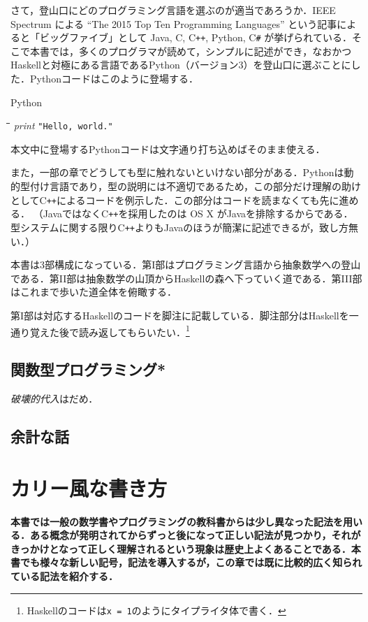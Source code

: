 \documentclass[twocolumn]{jsbook}
\newcommand{\cxx}{\textrm{C}\texttt{++}}
\newcommand{\keyword}[1]{{\emph{#1}}}
\newcommand{\code}[1]{\texttt{#1}}
\newenvironment{leader}{\begingroup\bf}{\endgroup}
\newenvironment{pythoncode}{\begin{itembox}[r]{Python}}{\end{itembox}}
\newenvironment{python}{\begin{tabbing}\hspace*{1em}\=\hspace*{1em}\=\hspace*{1em}\=\hspace*{1em}\=\kill}{\end{tabbing}}
\newcommand{\pthnId}[1]{\textit{#1}}
\newcommand{\pthnString}[1]{\texttt{#1}}
\begin{document}
さて，登山口にどのプログラミング言語を選ぶのが適当であろうか．IEEE Spectrum による ``The 2015 Top Ten Programming Languages'' という記事によると「ビッグファイブ」として Java, C, \cxx, Python, C\texttt{\#} が挙げられている．そこで本書では，多くのプログラマが読めて，シンプルに記述ができ，なおかつHaskellと対極にある言語であるPython（バージョン3）を登山口に選ぶことにした．Pythonコードはこのように登場する．
\begin{pythoncode}
\begin{python}
\pthnId{print} \pthnString{"Hello, world."}
\end{python}
\end{pythoncode}
本文中に登場するPythonコードは文字通り打ち込めばそのまま使える．

また，一部の章でどうしても型に触れないといけない部分がある．Pythonは動的型付け言語であり，型の説明には不適切であるため，この部分だけ理解の助けとして\cxx によるコードを例示した．この部分はコードを読まなくても先に進める． （Javaではなく\cxx を採用したのは OS X がJavaを排除するからである．型システムに関する限り\cxx よりもJavaのほうが簡潔に記述できるが，致し方無い．）

本書は3部構成になっている．第I部はプログラミング言語から抽象数学への登山である．第II部は抽象数学の山頂からHaskellの森へ下っていく道である．第III部はこれまで歩いた道全体を俯瞰する．

第I部は対応するHaskellのコードを脚注に記載している．脚注部分はHaskellを一通り覚えた後で読み返してもらいたい．\footnote{Haskellのコードは\code{x = 1}のようにタイプライタ体で書く．}

\section{関数型プログラミング*}

\keyword{破壊的代入}はだめ．

\section{余計な話}


\chapter{カリー風な書き方}

\begin{leader}
本書では一般の数学書やプログラミングの教科書からは少し異なった記法を用いる．ある概念が発明されてからずっと後になって正しい記法が見つかり，それがきっかけとなって正しく理解されるという現象は歴史上よくあることである．本書でも様々な新しい記号，記法を導入するが，この章では既に比較的広く知られている記法を紹介する．
\end{leader}
\end{document}
